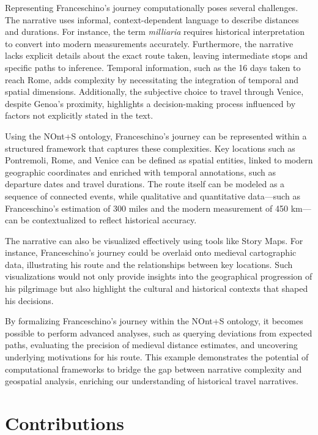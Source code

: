 Representing Franceschino’s journey computationally poses several challenges. The narrative uses informal, context-dependent language to describe distances and durations. For instance, the term \textit{milliaria} requires historical interpretation to convert into modern measurements accurately. Furthermore, the narrative lacks explicit details about the exact route taken, leaving intermediate stops and specific paths to inference. Temporal information, such as the 16 days taken to reach Rome, adds complexity by necessitating the integration of temporal and spatial dimensions. Additionally, the subjective choice to travel through Venice, despite Genoa's proximity, highlights a decision-making process influenced by factors not explicitly stated in the text.

Using the NOnt+S ontology, Franceschino’s journey can be represented within a structured framework that captures these complexities. Key locations such as Pontremoli, Rome, and Venice can be defined as spatial entities, linked to modern geographic coordinates and enriched with temporal annotations, such as departure dates and travel durations. The route itself can be modeled as a sequence of connected events, while qualitative and quantitative data—such as Franceschino’s estimation of 300 miles and the modern measurement of 450 km—can be contextualized to reflect historical accuracy.

The narrative can also be visualized effectively using tools like Story Maps. For instance, Franceschino’s journey could be overlaid onto medieval cartographic data, illustrating his route and the relationships between key locations. Such visualizations would not only provide insights into the geographical progression of his pilgrimage but also highlight the cultural and historical contexts that shaped his decisions.

By formalizing Franceschino’s journey within the NOnt+S ontology, it becomes possible to perform advanced analyses, such as querying deviations from expected paths, evaluating the precision of medieval distance estimates, and uncovering underlying motivations for his route. This example demonstrates the potential of computational frameworks to bridge the gap between narrative complexity and geospatial analysis, enriching our understanding of historical travel narratives.


\section{Contributions}

